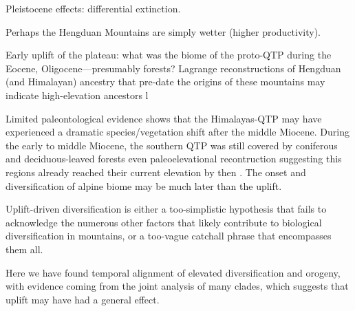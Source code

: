 Pleistocene effects: differential extinction.

Perhaps the Hengduan Mountains are simply wetter (higher productivity).



Early uplift of the plateau: what was the biome of the proto-QTP during the Eocene, Oligocene---presumably forests? Lagrange reconstructions of Hengduan (and Himalayan) ancestry that pre-date the origins of these mountains may indicate high-elevation ancestors l

Limited paleontological evidence shows that the Himalayas-QTP may have experienced a dramatic species/vegetation shift after the middle Miocene. During the early to middle Miocene, the southern QTP was still covered by coniferous and deciduous-leaved forests \citep{SunJ2014,LiH1976} even paleoelevational recontruction suggesting this regions already reached their current elevation by then \citep{Spicer2003}. The onset and diversification of alpine biome may be much later than the uplift.

Uplift-driven diversification is either a too-simplistic hypothesis that fails to acknowledge the numerous other factors that likely contribute to biological diversification in mountains, or a too-vague catchall phrase that encompasses them all.

Here we have found temporal alignment of elevated diversification and orogeny, with evidence coming from the joint analysis of many clades, which suggests that uplift may have had a general effect.

